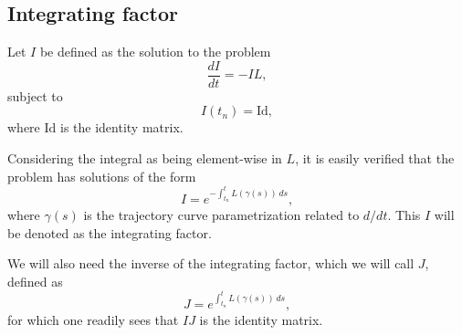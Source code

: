 \documentclass[10pt,a4paper]{article}
\begin{document}
\subsection{Integrating factor}

Let $I$ be defined as the solution to the problem 
\begin{equation}
\frac{dI}{dt}=-IL,
 \end{equation}
 subject to
\begin{equation}
I(t_n)=\text{Id},
 \end{equation}
 where $\text{Id}$ is the identity matrix.
 
 
Considering the integral as being element-wise in $L$, it is easily verified that the problem has solutions of the form
\begin{equation}
I=e^{-\int_{t_n}^t L(\gamma(s))\, ds},
\end{equation} 
where $\gamma(s)$ is the trajectory curve  parametrization related to $d/dt$. This $I$ will be denoted as the integrating factor.



%

We will also need the inverse of the integrating factor, which we will call $J$,  defined as
\begin{equation}
J=e^{\int_{t_n}^t L(\gamma(s))\, ds},
\end{equation} 
for which one readily sees that $IJ$ is the identity matrix.
\end{document}
